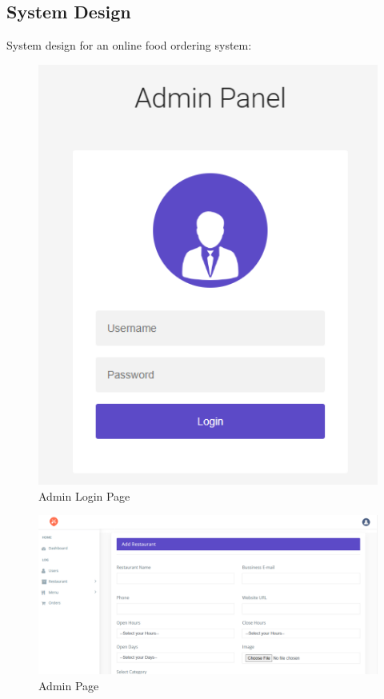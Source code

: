{\subsection{System Design}
{System design for an online food ordering system:
\begin{figure}[h]
    \centering
    \includegraphics[scale=0.55]{admin1.png}
    \caption{Admin Login Page}
    \label{fig.a}
\end{figure}\begin{figure}[h]
    \centering
    \includegraphics[scale=0.55]{admin2.png}
    \caption{Admin Page}
    \label{fig.b}
\end{figure}\begin{figure}[h]

\end{figure}}}
